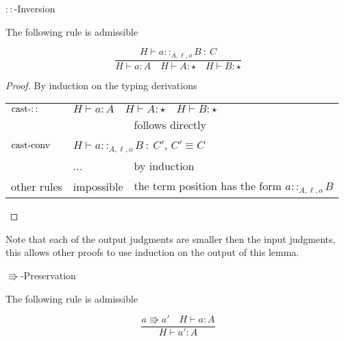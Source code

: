 \begin{lem}
$::$-Inversion

The following rule is admissible
\end{lem}

\[
\frac{H\vdash a::_{A,\ensuremath{\ell},o}B\::\:C}{H\vdash a:A\quad H\vdash A:\star\quad H\vdash B:\star}
\]

\begin{proof}
By induction on the typing derivations

\begin{tabular}{lll}
$\operatorname{cast-::}$ & \multicolumn{2}{l}{$H\vdash a:A\quad H\vdash A:\star\quad H\vdash B:\star$}\tabularnewline
 &  & follows directly\tabularnewline
$\operatorname{cast-conv}$ & \multicolumn{2}{l}{$H\vdash a::_{A,\ensuremath{\ell},o}B\::\:C'$, $C'\equiv C$}\tabularnewline
 & ... & by induction\tabularnewline
other rules & impossible & the term position has the form $a::_{A,\ensuremath{\ell},o}B$\tabularnewline
\end{tabular}
\end{proof}
Note that each of the output judgments are smaller then the input
judgments, this allows other proofs to use induction on the output
of this lemma.
\begin{thm}
$\Rrightarrow$-Preservation 

The following rule is admissible

\[
\frac{a\Rrightarrow a'\quad H\vdash a:A}{H\vdash a':A}
\]
\end{thm}

